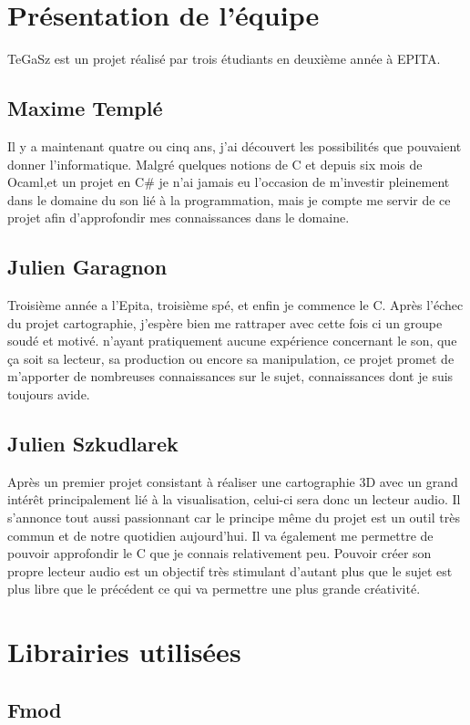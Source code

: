 \documentclass[12pt,a4paper]{report}
\begin{document}
\section{Présentation de l'équipe}
TeGaSz est un projet réalisé par trois étudiants en deuxième année à EPITA.
	\subsection{Maxime Templé}
Il y a maintenant quatre ou cinq ans, j'ai découvert les possibilités que pouvaient donner l'informatique. Malgré quelques notions de C et depuis six mois de Ocaml,et un projet en C\# je n'ai jamais eu l'occasion de m'investir pleinement dans le domaine du son lié à la programmation, mais je compte me servir de ce projet afin d'approfondir mes connaissances dans le domaine.

	\subsection{Julien Garagnon}
Troisième année a l'Epita, troisième spé, et enfin je commence le C. Après l'échec du projet cartographie, j'espère bien me rattraper avec cette fois ci un groupe soudé et motivé. n'ayant pratiquement aucune expérience concernant le son, que ça soit sa lecteur, sa production ou encore sa manipulation, ce projet promet de m'apporter de nombreuses connaissances sur le sujet, connaissances dont je suis toujours avide.

	\subsection{Julien Szkudlarek}
Après un premier projet consistant à réaliser une cartographie 3D avec un grand intérêt principalement lié à la visualisation, celui-ci sera donc un lecteur audio. Il s'annonce tout aussi passionnant car le principe même du projet est un outil très commun et de notre quotidien aujourd'hui. Il va également me permettre de pouvoir approfondir le C que je connais relativement peu. Pouvoir créer son propre lecteur audio est un objectif très stimulant d'autant plus que le sujet est plus libre que le précédent ce qui va permettre une plus grande créativité.

\section{Librairies utilisées}
	\subsection{Fmod}
\end{document}

